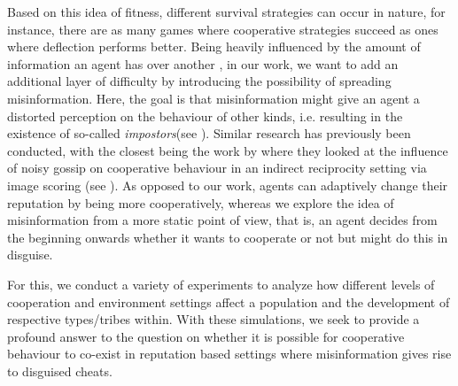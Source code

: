 \documentclass[sigconf]{acmart}
\newcommand{\todo}[1]{{\color{red}{#1}}}
\newcommand{\impostors}{\textit{impostors}\xspace}
\begin{document}

    Based on this idea of fitness, different survival strategies can occur in nature, for instance, there are as many games where cooperative strategies succeed as ones where deflection performs better.
    Being heavily influenced by the amount of information an agent has over another \cite{wallace_misinformation_1973}, in our work, we want to add an additional layer of difficulty by introducing the possibility of spreading misinformation.
    Here, the goal is that misinformation might give an agent a distorted perception on the behaviour of other kinds, i.e. resulting in the existence of so-called \impostors (see ).
    Similar research has previously been conducted, with the closest being the work by \citeauthor{szamado_deception_2016} \cite{szamado_deception_2016} where they looked at the influence of noisy gossip on cooperative behaviour in an indirect reciprocity setting via image scoring (see ).
    As opposed to our work, agents can adaptively change their reputation by being more cooperatively, whereas we explore the idea of misinformation from a more static point of view, that is, an agent decides from the beginning onwards whether it wants to cooperate or not but might do this in disguise.

    For this, we conduct a variety of experiments to analyze how different levels of cooperation and environment settings affect a population and the development of respective types/tribes within.
    With these simulations, we seek to provide a profound answer to the question on whether it is possible for cooperative behaviour to co-exist in reputation based settings where misinformation gives rise to disguised cheats.
\end{document}
